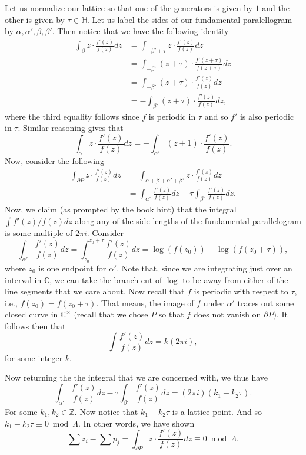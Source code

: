 \documentclass[12pt,letterpaper,boxed]{hmcpset}
\newcommand{\C}{\mathbb C}
\newcommand{\Z}{\mathbb Z}
\begin{document}
\begin{solution}
Let us normalize our lattice so that one of the generators is given by
$1$ and the other is given by $\tau \in \mathbb H$. 
Let us label the sides of our fundamental paralellogram by $\alpha,
\alpha', \beta, \beta'$.
Then notice that we have the following identity 
\begin{align*}
	\int_{\beta} z \cdot \frac{f'(z)}{f(z)} dz 
	&= \int_{-\beta' + \tau} z \cdot \frac{f'(z)}{f(z)} dz \\
	&= \int_{-\beta'} (z + \tau) \cdot \frac{f'(z+\tau)}{f(z+\tau)} dz \\
	&= \int_{-\beta'} (z + \tau) \cdot \frac{f'(z)}{f(z)} dz \\
	&= -\int_{\beta'} (z + \tau) \cdot \frac{f'(z)}{f(z)} dz,
\end{align*}
where the third equality follows since $f$ is periodic in $\tau$ and
so $f'$ is also periodic in $\tau$. 
Similar reasoning gives that 
\[
	\int_{\alpha} z \cdot \frac{f'(z)}{f(z)} dz = -\int_{\alpha'} (z+1) \cdot \frac{f'(z)}{f(z)}.
\]
Now, consider the following
\begin{align*}
	\int_{\partial P} z \cdot \frac{f'(z)}{f(z)} dz 
	&= \int_{\alpha + \beta + \alpha' + \beta'} z \cdot \frac{f'(z)}{f(z)} dz \\
	&= \int_{\alpha'} \frac{f'(z)}{f(z)} dz - \tau \int_{\beta'} \frac{f'(z)}{f(z)} dz.
\end{align*}
Now, we claim (as prompted by the book hint) that the integral $\int
f'(z) / f(z) dz$ along any of the side lengths of the fundamental
parallelogram is some multiple of $2\pi i$. 
Consider 
\[
	\int_{\alpha'} \frac{f'(z)}{f(z)} dz 
	= \int_{z_0}^{z_0 + \tau} \frac{f'(z)}{f(z)} dz 
	= \log(f(z_0)) - \log(f(z_0 + \tau)),
\]
where $z_0$ is one endpoint for $\alpha'$. Note that, 
since we are integrating just over an interval in $\C$, we can
take the branch cut of $\log$ to be away from either of the line segments
that we care about. 
Now recall that $f$ is periodic with respect to $\tau$, i.e., $f(z_0)
= f(z_0 + \tau)$. 
That means, 
the image of $f$ under $\alpha'$ traces out some closed curve in
$\C^\times$ (recall that we chose $P$ so that $f$ does not vanish on
$\partial P$). 
It follows then that 
\[
	\int \frac{f'(z)}{f(z)} dz = k(2\pi i),
\]
for some integer $k$. 

Now returning the the integral that we are concerned with, we thus have 
\[
	\int_{\alpha'} \frac{f'(z)}{f(z)} dz - \tau \int_{\beta'} \frac{f'(z)}{f(z)} dz
	= (2\pi i)(k_1 - k_2 \tau).
\]
For some $k_1, k_2 \in \Z$. 
Now notice that $k_1 - k_2 \tau$ is a lattice point. And so 
$k_1 - k_2 \tau \equiv 0 \bmod \Lambda$. 
In other words, we have shown 
\[
	\sum z_i - \sum p_j = 
	\int_{\partial P} z \cdot \frac{f'(z)}{f(z)} dz \equiv 0 \bmod \Lambda.
\]


\end{solution}
\end{document}
